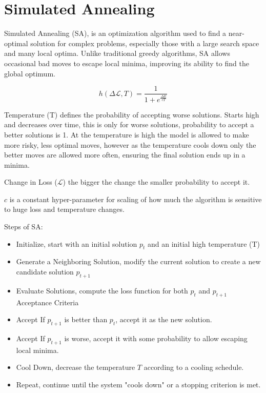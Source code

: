 \documentclass{article}
\begin{document}
\section{Simulated Annealing}

Simulated Annealing (SA), is an optimization algorithm used to find a near-optimal solution for complex problems, especially those with a large search space and many local optima. Unlike traditional greedy algorithms, SA allows occasional bad moves to escape local minima, improving its ability to find the global optimum.

\begin{equation}
    h\left(\Delta \mathcal L, T\right) = \frac{1}{1 + e^{\frac{\Delta E}{cT}}}
\end{equation}

Temperature (T) defines the probability of accepting worse solutions. Starts high and decreases over time, this is only for worse solutions, probability to accept a better solutions is 1. At the temperature is high the model is allowed to make more risky, less optimal moves, however as the temperature cools down only the better moves are allowed more often, ensuring the final solution ends up in a minima.

Change in Loss ($\mathcal L$) the bigger the change the smaller probability to accept it.

$c$ is a constant hyper-parameter for scaling of how much the algorithm is sensitive to huge loss and temperature changes. 

Steps of SA:
\begin{itemize}
    \item Initialize, start with an initial solution $p_t$ and an initial high temperature (T)
    \item Generate a Neighboring Solution, modify the current solution to create a new candidate solution $p_{t+1}$
    \item Evaluate Solutions, compute the loss function for both $p_t$ and $p_{t+1}$
    Acceptance Criteria
    \item Accept If $p_{t+1}$ is better than $p_t$, accept it as the new solution.
    \item Accept If $p_{t+1}$ is worse, accept it with some probability to allow escaping local minima.
    \item Cool Down, decrease the temperature $T$ according to a cooling schedule.
    \item Repeat, continue until the system "cools down" or a stopping criterion is met.
\end{itemize}
\end{document}
